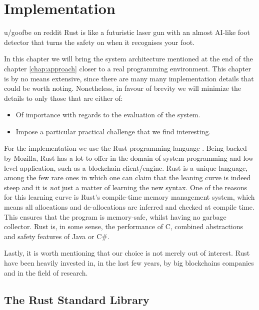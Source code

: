 \chapter{Implementation} \label{chap:impl}

\begin{chapquote}{u/goofbe on reddit}
	Rust is like a futuristic laser gun with an almost AI-like foot detector that turns the safety
	on when it recognises your foot.
\end{chapquote}

In this chapter we will bring the system architecture mentioned at the end of the chapter
\ref{chap:approach} closer to a real programming environment. This chapter is by no means extensive,
since there are many many implementation details that could be worth noting. Nonetheless, in favour
of brevity we will minimize the details to only those that are either of:

\begin{itemize}
	\item Of importance with regards to the evaluation of the system.
	\item Impose a particular practical challenge that we find interesting.
\end{itemize}

For the implementation we use the Rust programming language
\cite{klabnikRustProgrammingLanguage2019}. Being backed by Mozilla, Rust has a lot to offer in the
domain of system programming and low level application, such as a blockchain client/engine. Rust is
a unique language, among the few rare ones in which one can claim that the leaning curve is indeed
steep and it is \textit{not} just a matter of learning the new syntax. One of the reasons for this
learning curve is Rust's compile-time memory management system, which means all allocations and
de-allocations are inferred and checked at compile time. This ensures that the program is
memory-safe, whilst having no garbage collector. Rust is, in some sense, the performance of C,
combined abstractions and safety features of Java or C\#\cite{jungRustBeltSecuringFoundations2017}.

Lastly, it is worth mentioning that our choice is not merely out of interest. Rust have been heavily
invested in, in the last few years, by big blockchains companies and in the field of
research\cite{RustBlockchain}.

\section{The Rust Standard Library}

